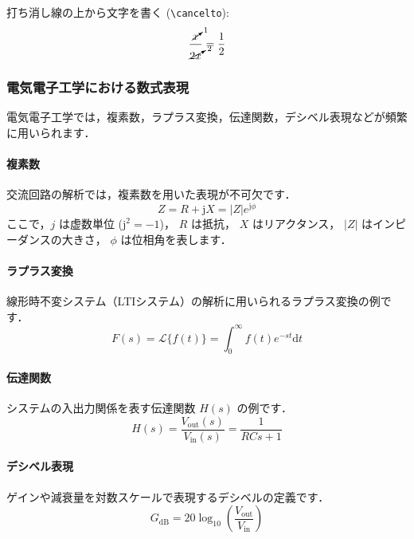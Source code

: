 \documentclass[
  a4paper,  %
  11pt,     %
]{ltjsarticle}%
\begin{document}
打ち消し線の上から文字を書く (\verb|\cancelto|):
\begin{equation}
  \frac{\cancelto{1}{x}}{\cancelto{2}{2x}} = \frac{1}{2}
\end{equation}

\subsubsection{電気電子工学における数式表現}

電気電子工学では，複素数，ラプラス変換，伝達関数，デシベル表現などが頻繁に用いられます．

\paragraph{複素数}
交流回路の解析では，複素数を用いた表現が不可欠です．
\begin{equation}
  Z = R + \mathrm{j}X = |Z|e^{\mathrm{j}\phi}
\end{equation}
ここで，$j$ は虚数単位 ($\mathrm{j}^2 = -1$)， $R$ は抵抗， $X$ はリアクタンス， $|Z|$ はインピーダンスの大きさ， $\phi$ は位相角を表します．

\paragraph{ラプラス変換}
線形時不変システム（LTIシステム）の解析に用いられるラプラス変換の例です．
\begin{equation}
  F(s) = \mathcal{L}\{f(t)\} = \int_0^\infty f(t)e^{-st} \mathrm{d}t
\end{equation}

\paragraph{伝達関数}
システムの入出力関係を表す伝達関数 $H(s)$ の例です．
\begin{equation}
  H(s) = \frac{V_{\mathrm{out}}(s)}{V_{\mathrm{in}}(s)} = \frac{1}{RCs + 1}
\end{equation}

\paragraph{デシベル表現}
ゲインや減衰量を対数スケールで表現するデシベルの定義です．
\begin{equation}
  G_{\mathrm{dB}} = 20 \log_{10} \left( \frac{V_{\mathrm{out}}}{V_{\mathrm{in}}} \right)
\end{equation}
\end{document}
